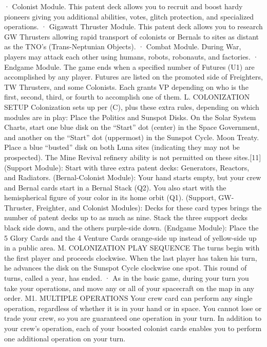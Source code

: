 \documentclass[a4paper]{book}
\begin{document}
·       Colonist Module. This patent deck allows you to recruit and boost hardy pioneers giving you additional abilities, votes, glitch protection, and specialized operations.
·       Gigawatt Thruster Module. This patent deck allows you to research GW Thrusters allowing rapid transport of colonists or Bernals to sites as distant as the TNO's (Trans-Neptunian Objects).
·       Combat Module. During War, players may attack each other using humans, robots, robonauts, and factories.
·       Endgame Module. The game ends when a specified number of Futures (U1) are accomplished by any player. Futures are listed on the promoted side of Freighters, TW Thrusters, and some Colonists. Each grants VP depending on who is the first, second, third, or fourth to accomplish one of them.
L. COLONIZATION SETUP
Colonization sets up per (C), plus these extra rules, depending on which modules are in play:
Place the Politics and Sunspot Disks. On the Solar System Charts, start one blue disk on the “Start” dot (center) in the Space Government, and another on the “Start” dot (uppermost) in the Sunspot Cycle.
Moon Treaty. Place a blue “busted” disk on both Luna sites (indicating they may not be prospected). The Mine Revival refinery ability is not permitted on these sites.[11]
(Support Module): Start with three extra patent decks: Generators, Reactors, and Radiators.
(Bernal-Colonist Module): Your hand starts empty, but your crew and Bernal cards start in a Bernal Stack (Q2). You also start with the hemispherical figure of your color in its home orbit (Q1). 
(Support, GW-Thruster, Freighter, and Colonist Modules): Decks for these card types brings the number of patent decks up to as much as nine. Stack the three support decks black side down, and the others purple-side down.
(Endgame Module): Place the 5 Glory Cards and the 4 Venture Cards  orange-side up instead of yellow-side up in a public area.
M. COLONIZATION PLAY SEQUENCE
The turns begin with the first player and proceeds clockwise. When the last player has taken his turn, he advances the disk on the Sunspot Cycle clockwise one spot. This round of turns, called a year, has ended.
·       As in the basic game, during your turn you take your operations, and move any or all of your spacecraft on the map in any order.
M1. MULTIPLE OPERATIONS
Your crew card can perform any single operation, regardless of whether it is in your hand or in space. You cannot lose or trade your crew, so you are guaranteed one operation in your turn. In addition to your crew’s operation, each of your boosted colonist cards enables you to perform one additional operation on your turn.
\end{document}
